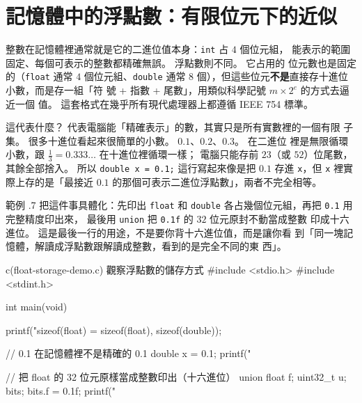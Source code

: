 \section{記憶體中的浮點數：有限位元下的近似}
\label{sec:float-bit-repr}

整數在記憶體裡通常就是它的二進位值本身：\texttt{int} 占 $4$ 個位元組，
能表示的範圍固定、每個可表示的整數都精確無誤。 浮點數則不同。 它占用的
位元數也是固定的（\texttt{float} 通常 $4$ 個位元組、\texttt{double}
通常 $8$ 個），但這些位元\textbf{不是}直接存十進位小數，而是存一組「符
號 + 指數 + 尾數」，用類似科學記號 $m \times 2^e$ 的方式去逼近一個
值。 這套格式在幾乎所有現代處理器上都遵循 IEEE 754 標準。

\begin{center}
\label{fig:ch07-float-bit-layout}
\end{center}

這代表什麼？ 代表電腦能「精確表示」的數，其實只是所有實數裡的一個有限
子集。 很多十進位看起來很簡單的小數。 $0.1$、$0.2$、$0.3$。 在二進位
裡是無限循環小數，跟 $\frac{1}{3} = 0.333\ldots$ 在十進位裡循環一樣；
電腦只能存前 $23$（或 $52$）位尾數，其餘全部捨入。 所以 \texttt{double
x = 0.1;} 這行寫起來像是把 $0.1$ 存進 \texttt{x}，但 \texttt{x} 裡實
際上存的是「最接近 $0.1$ 的那個可表示二進位浮點數」，兩者不完全相等。

範例 \thechapter.7 把這件事具體化：先印出 \texttt{float} 和
\texttt{double} 各占幾個位元組，再把 \texttt{0.1} 用完整精度印出來，
最後用 \texttt{union} 把 \texttt{0.1f} 的 $32$ 位元原封不動當成整數
印成十六進位。 這是最後一行的用途，不是要你背十六進位值，而是讓你看
到「同一塊記憶體，解讀成浮點數跟解讀成整數，看到的是完全不同的東
西」。

\begin{example}{c}{(float-storage-demo.c) 觀察浮點數的儲存方式}
#include <stdio.h>
#include <stdint.h>

int main(void) {
    printf("sizeof(float) = %
           sizeof(float), sizeof(double));

    // 0.1 在記憶體裡不是精確的 0.1
    double x = 0.1;
    printf("%

    // 把 float 的 32 位元原樣當成整數印出（十六進位）
    union {
        float f;
        uint32_t u;
    } bits;
    bits.f = 0.1f;
    printf("%
}
\end{example}


